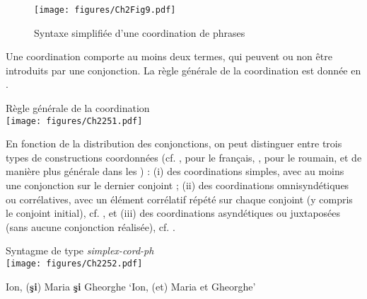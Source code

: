 \begin{figure} 

   \texttt{[image: figures/Ch2Fig9.pdf]}

\caption{Syntaxe simplifiée d’une coordination de phrases}
\label{ch2:fig9}
\end{figure}


Une coordination comporte au moins deux termes, qui peuvent ou non être introduits par une conjonction. La règle générale de la coordination est donnée en .

\ea \label{ch2:ex251}
Règle générale de la coordination\\
\texttt{[image: figures/Ch2251.pdf]}


\z

En fonction de la distribution des conjonctions, on peut distinguer entre trois types de constructions coordonnées (cf. \citealt{Mouret2006}, \citealt{Mouret2007} pour le français, \citealt{Bilbiie2008}, \citealt{Bilbiie2011} pour le roumain, et de manière plus générale dans les ) : (i) des coordinations simples, avec au moins une conjonction sur le dernier conjoint  ; (ii) des coordinations omnisyndétiques ou corrélatives, avec un élément corrélatif répété sur chaque conjoint (y compris le conjoint initial), cf. , et (iii) des coordinations asyndétiques ou juxtaposées (sans aucune conjonction réalisée), cf. . 

\ea \label{ch2:ex252}
\ea Syntagme de type \textit{simplex-cord-ph}\\
\texttt{[image: figures/Ch2252.pdf]}


\ex Ion, (\textbf{şi}) Maria \textbf{şi} Gheorghe
\glt ‘Ion, (et) Maria et Gheorghe’
\z
\z



